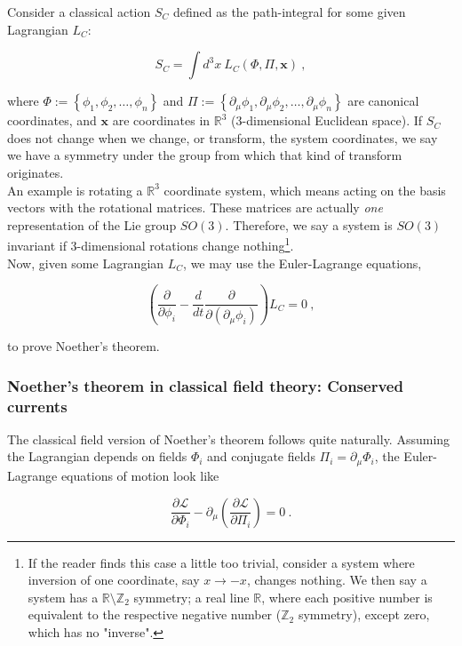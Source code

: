 \documentclass[10pt,twoside]{report}
\begin{document}
	Consider a classical action $S_{C}$ defined as the path-integral for some given Lagrangian $L_{C}$:
	
	\begin{equation}
		S_{C} = \int d^3x \:L_{C}(\Phi,\Pi,\bm{x})\:,
	\end{equation}
	
	\noindent where $\Phi := \left\{\phi_1,\phi_2,\ldots,\phi_n\right\}$ and  $\Pi := \left\{\partial_\mu\phi_1,\partial_\mu\phi_2,\ldots,\partial_\mu\phi_n\right\}$ are canonical coordinates, and $\bm{x}$ are coordinates in $\mathbb{R}^3$ (3-dimensional Euclidean space). If $S_C$ does not change when we change, or transform, the system coordinates, we say we have a symmetry under the group from which that kind of transform originates.\\
	An example is  rotating a $\mathbb{R}^3$ coordinate system, which means acting on the basis vectors with the rotational matrices. These matrices are actually \emph{one} representation of the Lie group $SO(3)$. Therefore, we say a system is $SO(3)$ invariant if 3-dimensional rotations change nothing\footnote{If the reader finds this case a little too trivial, consider a system where inversion of one coordinate, say $x\rightarrow -x$, changes nothing. We then say a system has a $\mathbb{R}\setminus\mathbb{Z}_2$ symmetry; a real line $\mathbb{R}$, where each positive number is equivalent to the respective negative number ($\mathbb{Z}_2$ symmetry), except zero, which has no "inverse".}.\\
	
	Now, given some Lagrangian $L_C$, we may use the Euler-Lagrange equations,
	
	\begin{equation}
		\left(\frac{\partial}{\partial \phi_i} - \frac{d}{dt}\frac{\partial}{\partial \left(\partial_\mu \phi_i\right)}\right)L_C = 0\:,
	\end{equation}
	
	\noindent to prove Noether's theorem.
	
	\subsubsection{Noether's theorem in classical field theory: Conserved currents}
	The classical field version of Noether's theorem follows quite naturally. Assuming the Lagrangian depends on fields $\Phi_i$ and conjugate fields $\Pi_i=\partial_\mu\Phi_i$, the Euler-Lagrange equations of motion look like
	
	\begin{equation}
		\frac{\partial\mathcal{L}}{\partial\Phi_i} - \partial_\mu\left(\frac{\partial\mathcal{L}}{\partial\Pi_i}\right) = 0\:.
		\label{ChPtTh | eq | euler-lagrange for fields}
	\end{equation}
	
\end{document}
